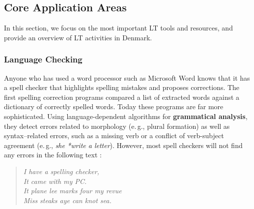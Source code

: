 \documentclass[]{../../metanetpaper}
\begin{document}
\begin{multicols}{2}
\subsection{Core Application Areas}

In this section, we focus on the most important LT tools and resources, and provide an overview of LT activities in Denmark. 

\subsubsection{Language Checking}

Anyone who has used a word processor such as Microsoft Word knows that it has a spell checker that highlights spelling mistakes and proposes corrections. The first spelling correction programs compared a list of extracted words against a dictionary of correctly spelled words. Today these programs are far more sophisticated. Using language-dependent algorithms for \textbf{grammatical analysis}, they detect errors related to morphology (e.\,g., plural formation) as well as syntax–related errors, such as a missing verb or a conflict of verb-subject agreement (e.\,g., \textit{she *write a letter}). However, most spell checkers will not find any errors in the following text \cite{zar1}:

\begin{quote}
  {\it I have a spelling checker,\\
  It came with my PC.\\
  It plane lee marks four my revue\\
  Miss steaks aye can knot sea.}
\end{quote}


\end{multicols}
\end{document}
